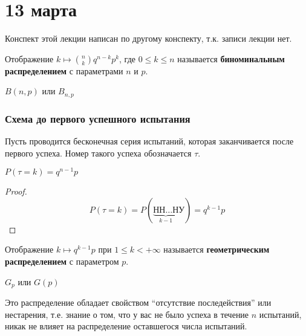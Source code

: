\chapter{13 марта}

\begin{remark}
    Конспект этой лекции написан по другому конспекту, т.к. записи лекции нет.
\end{remark}

\begin{definition}
    Отображение \(k \mapsto \binom{n}{k} q^{n - k}p^k\), где \(0 \leq k \leq n\) называется \textbf{биноминальным распределением} с параметрами \(n\) и \(p\).
\end{definition}

\begin{obozn}
    \(B(n,p)\) или \(B_{n, p}\)
\end{obozn}

\subsection{Схема до первого успешного испытания}

Пусть проводится бесконечная серия испытаний, которая заканчивается после первого успеха. Номер такого успеха обозначается \(\tau\).

\begin{theorem}
    \(P(\tau = k) = q^{n - 1}p\)
\end{theorem}
\begin{proof}
    \[P(\tau = k) = P(\underbrace{\text{НН}\dots\text{Н}}_{k - 1}\text{У}) = q^{k-1}p\]
\end{proof}

\begin{definition}
    Отображение \(k \mapsto q^{k - 1}p\) при \(1 \leq k < +\infty\) называется \textbf{геометрическим распределением} с параметром \(p\).
\end{definition}

\begin{obozn}
    \(G_p\) или \(G(p)\)
\end{obozn}

\begin{remark}
    Это распределение обладает свойством ``отсутствие последействия'' или нестарения, т.е. знание о том, что у вас не было успеха в течение \(n\) испытаний, никак не влияет на распределение оставшегося числа испытаний.
\end{remark}

